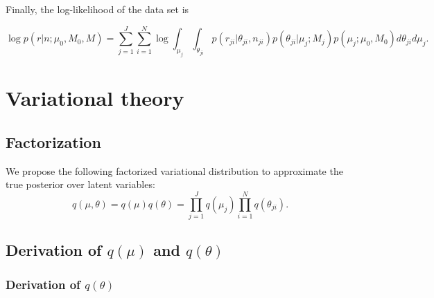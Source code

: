 \documentclass[11pt,reqno]{amsart}
\begin{document}
Finally, the log-likelihood of the data set is

\begin{equation}
\log p \left( r | n ; \mu_0, M_0, M \right) = \sum_{j=1}^J \sum_{i=1}^N \log \int_{\mu_j} \int_{\theta_{ji}}  p \left( r_{ji} | \theta_{ji}, n_{ji} \right) p\left( \theta_{ji} | \mu_j; M_j \right) p\left( \mu_j; \mu_0, M_0 \right) d\theta_{ji} d\mu_j.
\end{equation}



\section{Variational theory}

\subsection{Factorization} 

We propose the following factorized variational distribution to approximate the true posterior over latent variables:
\begin{equation}
  q(\mu, \theta) = q(\mu)q(\theta) = \prod_{j=1}^J q(\mu_{j}) \prod_{i=1}^N q(\theta_{ji}).
  \label{eq:vardist}
\end{equation}


\subsection{Derivation of $ q(\mu) $ and $ q(\theta) $}

\subsubsection{Derivation of $ q(\theta) $}
\end{document}
